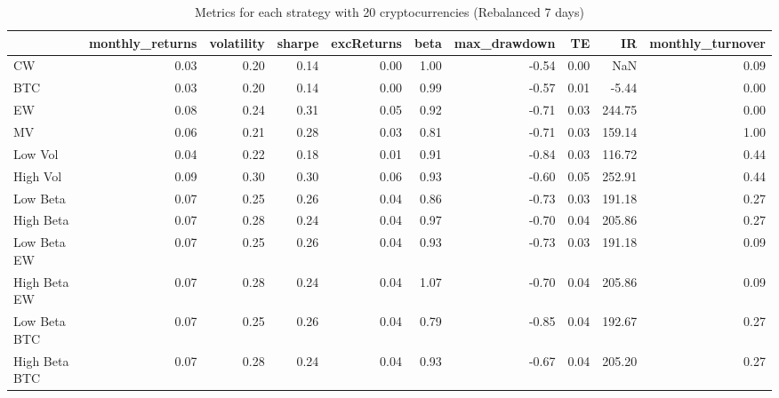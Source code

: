 \begin{table}
\centering
\caption{Metrics for each strategy with 20 cryptocurrencies (Rebalanced 7 days)}
\label{metrics20_7}
\begin{tabular}{lrrrrrrrrr}
\toprule
{} &  monthly\_returns &  volatility &  sharpe &  excReturns &  beta &  max\_drawdown &   TE &     IR &  monthly\_turnover \\
\midrule
CW            &             0.03 &        0.20 &    0.14 &        0.00 &  1.00 &         -0.54 & 0.00 &    NaN &              0.09 \\
BTC           &             0.03 &        0.20 &    0.14 &        0.00 &  0.99 &         -0.57 & 0.01 &  -5.44 &              0.00 \\
EW            &             0.08 &        0.24 &    0.31 &        0.05 &  0.92 &         -0.71 & 0.03 & 244.75 &              0.00 \\
MV            &             0.06 &        0.21 &    0.28 &        0.03 &  0.81 &         -0.71 & 0.03 & 159.14 &              1.00 \\
Low Vol       &             0.04 &        0.22 &    0.18 &        0.01 &  0.91 &         -0.84 & 0.03 & 116.72 &              0.44 \\
High Vol      &             0.09 &        0.30 &    0.30 &        0.06 &  0.93 &         -0.60 & 0.05 & 252.91 &              0.44 \\
Low Beta      &             0.07 &        0.25 &    0.26 &        0.04 &  0.86 &         -0.73 & 0.03 & 191.18 &              0.27 \\
High Beta     &             0.07 &        0.28 &    0.24 &        0.04 &  0.97 &         -0.70 & 0.04 & 205.86 &              0.27 \\
Low Beta EW   &             0.07 &        0.25 &    0.26 &        0.04 &  0.93 &         -0.73 & 0.03 & 191.18 &              0.09 \\
High Beta EW  &             0.07 &        0.28 &    0.24 &        0.04 &  1.07 &         -0.70 & 0.04 & 205.86 &              0.09 \\
Low Beta BTC  &             0.07 &        0.25 &    0.26 &        0.04 &  0.79 &         -0.85 & 0.04 & 192.67 &              0.27 \\
High Beta BTC &             0.07 &        0.28 &    0.24 &        0.04 &  0.93 &         -0.67 & 0.04 & 205.20 &              0.27 \\
\bottomrule
\end{tabular}
\end{table}
